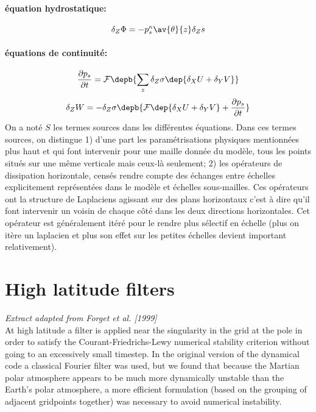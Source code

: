 \paragraph{\'equation hydrostatique:}
\begin{equation}
\dz \Phi=-\ps^\rcp  \av{\h}{z} \dz s
\end{equation}
%
\paragraph{\'equations de continuit\'e:}
%
\begin{equation}
\label{eq:cont1}
\dt{\ps}  = \filtre\depb{\sum_z{\dz \sigma \dep{\dx U+ \dy V}}}
\end{equation}
\begin{equation}
\label{eq:cont2}
\dz W   = -\dz \sigma \depb{\filtre\dep{\dx U+ \dy V} + \dt{\ps}}
\end{equation}
%
On a not\'e $S$ les termes sources dans les diff\'erentes \'equations.
Dans ces termes sources, on distingue 1) d'une part les param\'etrisations physiques mentionn\'ees plus haut et qui font intervenir pour une maille donn\'ee du mod\`ele, tous les points situ\'es sur une m\^eme verticale mais ceux-l\`a seulement; 2) les op\'erateurs de dissipation horizontale, cens\'es rendre compte des \'echanges entre \'echelles explicitement repr\'esent\'ees dans le mod\`ele et \'echelles sous-mailles. Ces op\'erateurs ont la structure de Laplaciens agissant sur des plans horizontaux c'est \`a dire qu'il font intervenir un voisin de chaque c\^ot\'e dans les deux directions horizontales. Cet op\'erateur est g\'en\'eralement it\'er\'e pour le rendre plus s\'electif en \'echelle (plus on it\`ere un laplacien et plus son effet sur les petites \'echelles devient important relativement).

\section{High latitude filters}

{\it Extract adapted from Forget et al. [1999]}\\

At high latitude a filter is applied near
the singularity in the grid at the pole
in order to satisfy the Courant-Friedrichs-Lewy numerical
stability criterion without going to an excessively
small timestep. In the original version of the dynamical code
a classical Fourier filter was used,  but
we found that because the Martian polar
atmosphere appears to be much more dynamically unstable than the Earth's
polar atmosphere, a more efficient formulation (based on the
grouping of adjacent gridpoints together)  was necessary
to avoid numerical instability. \\

